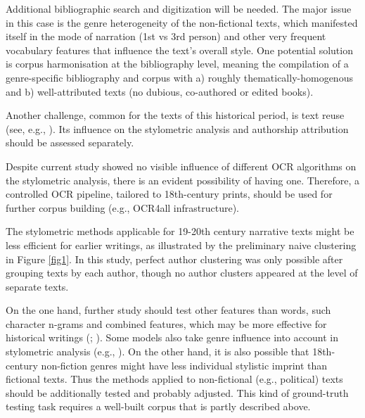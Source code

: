 \documentclass[12pt, letterpaper]{article}
\begin{document}
Additional bibliographic search and digitization will be needed. The major issue in this case is the genre heterogeneity of the non-fictional texts, which manifested itself in the mode of narration (1st vs 3rd person) and other very frequent vocabulary features that influence the text's overall style. One potential solution is corpus harmonisation at the bibliography level, meaning the compilation of a genre-specific bibliography and corpus with a) roughly thematically-homogenous and b) well-attributed texts (no dubious, co-authored or edited books).

Another challenge, common for the texts of this historical period, is text reuse (see, e.g., \cite{olsen_something_2011}). Its influence on the stylometric analysis and authorship attribution should be assessed separately.

Despite current study showed no visible influence of different OCR algorithms on the stylometric analysis, there is an evident possibility of having one. Therefore, a controlled OCR pipeline, tailored to 18th-century prints, should be used for further corpus building (e.g., OCR4all infrastructure).

The stylometric methods applicable for 19-20th century narrative texts might be less efficient for earlier writings, as illustrated by the preliminary naive clustering in Figure \ref{fig1}. In this study, perfect author clustering was only possible after grouping texts by each author, though no author clusters appeared at the level of separate texts.

On the one hand, further study should test other features than words, such character n-grams and combined features, which may be more effective for historical writings (\cite{eder_mind_2013}; \cite{camps_stylometry_2020}). Some models also take genre influence into account in stylometric analysis (e.g., \cite{schoch_progress_2014}). On the other hand, it is also possible that 18th-century non-fiction genres might have less individual stylistic imprint than fictional texts. Thus the methods applied to non-fictional (e.g., political) texts should be additionally tested and probably adjusted. This kind of ground-truth testing task requires a well-built corpus that is partly described above.



\printbibliography
\end{document}
